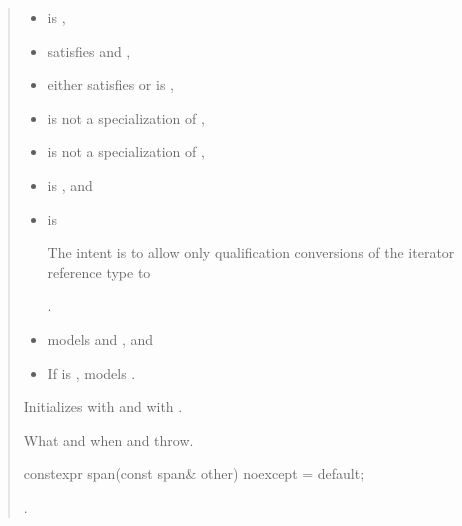 \documentclass{wg21}
\begin{document}
\begin{quote}
\begin{addedblock}
\begin{itemdescr}
    \pnum
    \constraints
    \begin{itemize}
       \item {} is ,
       \item {} satisfies  and ,
       \item either  satisfies  or  is ,
       \item {} is not a specialization of ,
       \item {} is not a specialization of ,
       \item {} is , and
       \item {} is 
       \begin{note}The intent is to allow only qualification conversions of the iterator reference type to  \end{note}.
    \end{itemize}

	\expects 
	\begin{itemize}
	\item {} models  and , and
	\item If  is ,  models .
	\end{itemize}

    \pnum
    \effects Initializes  with  and  with .

    \pnum
    \throws
    What and when  and  throw.

\end{itemdescr}
\end{addedblock}

\begin{itemdecl}
constexpr span(const span& other) noexcept = default;
\end{itemdecl}
\begin{itemdescr}
    \pnum
    \ensures
    .
\end{itemdescr}

\end{quote}
\end{document}
